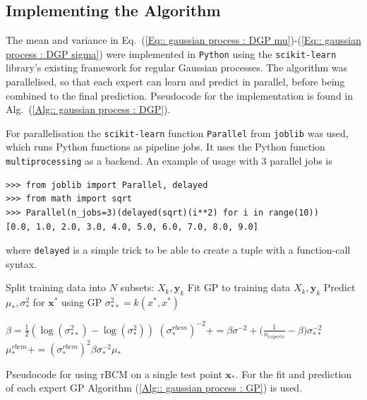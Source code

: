 \documentclass[twoside,english]{uiofysmaster}
\begin{document}
\subsection{Implementing the Algorithm}

The mean and variance in Eq.\ (\ref{Eq:: gaussian process : DGP mu})-(\ref{Eq:: gaussian process : DGP sigma}) were implemented in \verb|Python| using the \verb|scikit-learn| library's existing framework for regular Gaussian processes. The algorithm was parallelised, so that each expert can learn and predict in parallel, before being combined to the final prediction. Pseudocode for the implementation is found in Alg.\ (\ref{Alg:: gaussian process : DGP}).

For parallelisation the \verb|scikit-learn| function \verb|Parallel| from \verb|joblib| was used, which runs Python functions as pipeline jobs. It uses the Python function \verb|multiprocessing| as a backend. An example of usage with 3 parallel jobs is
\begin{lstlisting}
>>> from joblib import Parallel, delayed
>>> from math import sqrt
>>> Parallel(n_jobs=3)(delayed(sqrt)(i**2) for i in range(10))
[0.0, 1.0, 2.0, 3.0, 4.0, 5.0, 6.0, 7.0, 8.0, 9.0]
\end{lstlisting}
where \verb|delayed| is a simple trick to be able to create a tuple with a function-call syntax.


\begin{algorithm}
Split training data into $N$ subsets: $X_k, \textbf{y}_k$\;
{
Fit GP to training data $X_k, \textbf{y}_k$ \;
 Predict $\mu_*,\sigma_*^2 $ for $\textbf{x}^*$ using GP \;
 $\sigma_{**}^2 = k (x^*, x^*)$ \;
}
 
{ 
$\beta = \frac{1}{2} (\log (\sigma_{**}^2) - \log (\sigma_*^2))$ \;
$(\sigma_*^{rbcm})^{-2} += \beta \sigma^{-2} + \big(\frac{1}{n_{experts}} - \beta \big) \sigma_{**}^{-2} $ 
 }  
{ 
$\mu_*^{rbcm} += (\sigma_*^{rbcm})^2 \beta \sigma^{-2}_* \mu_*$
} 
 \caption{Pseudocode for using rBCM on a single test point $\textbf{x}_*$. For the fit and prediction of each expert GP Algorithm (\ref{Alg:: gaussian process : GP}) is used.}
\label{Alg:: gaussian process : DGP}
\end{algorithm}
\end{document}
